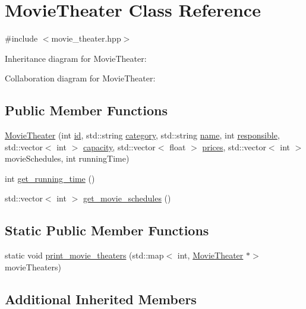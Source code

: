 \hypertarget{class_movie_theater}{}\section{Movie\+Theater Class Reference}
\label{class_movie_theater}


{\ttfamily \#include $<$movie\+\_\+theater.\+hpp$>$}



Inheritance diagram for Movie\+Theater\+:


Collaboration diagram for Movie\+Theater\+:
\subsection*{Public Member Functions}
\begin{DoxyCompactItemize}
\item 
\hyperlink{class_movie_theater_a917c9c9139916fdf9712da31e0453b93}{Movie\+Theater} (int \hyperlink{class_event_a08ba599a781bea8b678251fdb7290890}{id}, std\+::string \hyperlink{class_event_a5634221828f8d3f823598b1fa22e3392}{category}, std\+::string \hyperlink{class_event_ae116bf76fb01a92e000579a5a0d6f35c}{name}, int \hyperlink{class_event_aab3e742a3f882731bd73996f4c66eef1}{responsible}, std\+::vector$<$ int $>$ \hyperlink{class_event_a75eb887870ee5c4a4bf502d98a7cd6a3}{capacity}, std\+::vector$<$ float $>$ \hyperlink{class_event_a49d863913759f2294cc4c8bdbc2be9fe}{prices}, std\+::vector$<$ int $>$ movie\+Schedules, int running\+Time)
\item 
int \hyperlink{class_movie_theater_a91a12e686c2d774181991b127467e414}{get\+\_\+running\+\_\+time} ()
\item 
std\+::vector$<$ int $>$ \hyperlink{class_movie_theater_af8be0f4a4af131cbbd00ccf06644804e}{get\+\_\+movie\+\_\+schedules} ()
\end{DoxyCompactItemize}
\subsection*{Static Public Member Functions}
\begin{DoxyCompactItemize}
\item 
static void \hyperlink{class_movie_theater_a9a4320ced859c2bcd173e736aa940c83}{print\+\_\+movie\+\_\+theaters} (std\+::map$<$ int, \hyperlink{class_movie_theater}{Movie\+Theater} $\ast$$>$ movie\+Theaters)
\end{DoxyCompactItemize}
\subsection*{Additional Inherited Members}


